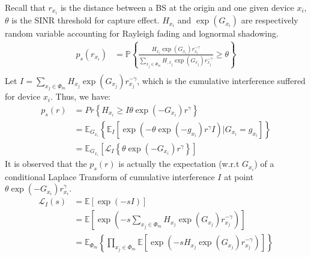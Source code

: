\renewcommand{\thesubsection}{\Alph{subsection}}
\label{sec:annexe}
Recall that $r_{x_i}$ is the distance between a BS at the origin and one given device $x_i$, $\theta$ is the SINR threshold for capture effect. $H_{x_i}$ and $\exp(G_{x_i})$ are respectively random variable accounting for Rayleigh fading and lognormal shadowing.
\begin{align}
p_{s} \left( r_{x_i} \right)
& =\mathbb{P}\left\lbrace \frac{H_{x_i} \exp(G_{x_i}) r_{x_i}^{-\gamma}}{\sum_{x_j \in \Phi_{m}} H_{, x_j} \exp(G_{x_j}) r_{x_j}^{-\gamma}}  \geq \theta \right\rbrace \nonumber\\
\end{align}
Let $I=\sum_{x_j \in \Phi_{m}} H_{x_j} \exp(G_{x_j}) r_{x_j}^{-\gamma}$, which is the cumulative interference suffered for device $x_i$. Thus, we have:
\begin{align}
\label{eq:def_ps}
p_{s}\left( r \right)  &= Pr \left\lbrace H_{x_i} \geq I \theta\exp(-G_{x_i})r ^{\gamma}  \right\rbrace  \nonumber\\
&=\mathbb{E}_{G_{x_i}}\left\lbrace  \mathbb{E}_{I} \left[ \exp(-\theta \exp(-g_{x_i}) r^{\gamma}  I ) \vert G_{x_i} = g_{x_i}\right]\right\rbrace   \nonumber\\
&= \mathbb{E}_{G_{x_i}} \left[ \mathcal{L}_{I}\left\lbrace \theta \exp(-G_{x_i}) r^{\gamma}\right\rbrace \right] 
\end{align}
It is observed that the $p_s\left( r \right)$ is actually the expectation (w.r.t $G_{x_i}$) of a conditional Laplace Transform of cumulative interference $I$ at point $\theta \exp(-G_{x_i})  r_{x_i}^{\gamma}$.
\begin{align}
\label{eq:interferece-laplace-transform}
\mathcal{L}_{I}\left( s \right)  &= \mathbb{E}\left[ \exp(-sI)\right] \nonumber\\
&= \mathbb{E}\left[ \exp(-s\sum_{x_j \in \Phi_m} H_{x_j} \exp(G_{x_j})  r_{x_j}^{-\gamma})\right] \nonumber \\
&= \mathbb{E}_{\Phi_m} \left\lbrace \prod_{x_j\in \Phi_m} \mathbb{E}\left[\exp(-sH_{x_j} \exp(G_{x_j})  r_{x_j}^{-\gamma})\right] \right\rbrace 
\end{align}


